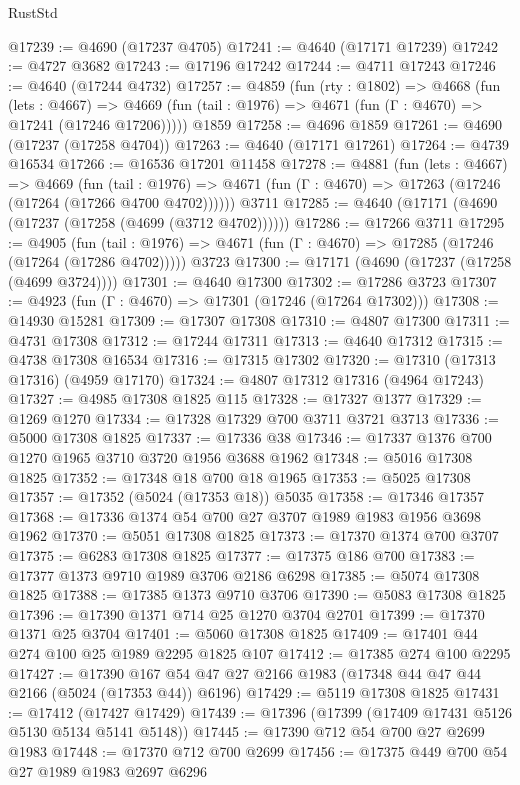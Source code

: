 \begin{lexlean}{RustStd}
\begin{coremodule}
@17239 := @4690 (@17237 @4705)
@17241 := @4640 (@17171 @17239)
@17242 := @4727 @3682
@17243 := @17196 @17242
@17244 := @4711 @17243
@17246 := @4640 (@17244 @4732)
@17257 := @4859
    (fun (rty : @1802) =>
    @4668
      (fun (lets : @4667) =>
      @4669 (fun (tail : @1976) => @4671 (fun (Γ : @4670) => @17241 (@17246 @17206)))))
    @1859
@17258 := @4696 @1859
@17261 := @4690 (@17237 (@17258 @4704))
@17263 := @4640 (@17171 @17261)
@17264 := @4739 @16534
@17266 := @16536 @17201 @11458
@17278 := @4881
    (fun (lets : @4667) =>
    @4669
      (fun (tail : @1976) =>
      @4671 (fun (Γ : @4670) => @17263 (@17246 (@17264 (@17266 @4700 @4702))))))
    @3711
@17285 := @4640 (@17171 (@4690 (@17237 (@17258 (@4699 (@3712 @4702))))))
@17286 := @17266 @3711
@17295 := @4905
    (fun (tail : @1976) => @4671 (fun (Γ : @4670) => @17285 (@17246 (@17264 (@17286 @4702)))))
    @3723
@17300 := @17171 (@4690 (@17237 (@17258 (@4699 @3724))))
@17301 := @4640 @17300
@17302 := @17286 @3723
@17307 := @4923 (fun (Γ : @4670) => @17301 (@17246 (@17264 @17302)))
@17308 := @14930 @15281
@17309 := @17307 @17308
@17310 := @4807 @17300
@17311 := @4731 @17308
@17312 := @17244 @17311
@17313 := @4640 @17312
@17315 := @4738 @17308 @16534
@17316 := @17315 @17302
@17320 := @17310 (@17313 @17316) (@4959 @17170)
@17324 := @4807 @17312 @17316 (@4964 @17243)
@17327 := @4985 @17308 @1825 @115
@17328 := @17327 @1377
@17329 := @1269 @1270
@17334 := @17328 @17329 @700 @3711 @3721 @3713
@17336 := @5000 @17308 @1825
@17337 := @17336 @38
@17346 := @17337 @1376 @700 @1270 @1965 @3710 @3720 @1956 @3688 @1962
@17348 := @5016 @17308 @1825
@17352 := @17348 @18 @700 @18 @1965
@17353 := @5025 @17308
@17357 := @17352 (@5024 (@17353 @18)) @5035
@17358 := @17346 @17357
@17368 := @17336 @1374 @54 @700 @27 @3707 @1989 @1983 @1956 @3698 @1962
@17370 := @5051 @17308 @1825
@17373 := @17370 @1374 @700 @3707
@17375 := @6283 @17308 @1825
@17377 := @17375 @186 @700
@17383 := @17377 @1373 @9710 @1989 @3706 @2186 @6298
@17385 := @5074 @17308 @1825
@17388 := @17385 @1373 @9710 @3706
@17390 := @5083 @17308 @1825
@17396 := @17390 @1371 @714 @25 @1270 @3704 @2701
@17399 := @17370 @1371 @25 @3704
@17401 := @5060 @17308 @1825
@17409 := @17401 @44 @274 @100 @25 @1989 @2295 @1825 @107
@17412 := @17385 @274 @100 @2295
@17427 := @17390 @167 @54 @47 @27 @2166 @1983 (@17348 @44 @47 @44 @2166 (@5024 (@17353 @44)) @6196)
@17429 := @5119 @17308 @1825
@17431 := @17412 (@17427 @17429)
@17439 := @17396 (@17399 (@17409 @17431 @5126 @5130 @5134 @5141 @5148))
@17445 := @17390 @712 @54 @700 @27 @2699 @1983
@17448 := @17370 @712 @700 @2699
@17456 := @17375 @449 @700 @54 @27 @1989 @1983 @2697 @6296

\end{coremodule}
\end{lexlean}

